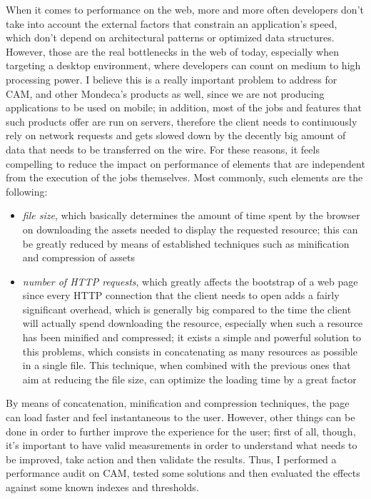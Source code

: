 \documentclass[12pt,oneside,svgnames]{memoir}
\begin{document}
When it comes to performance on the web, more and more often developers
don't take into account the external factors that constrain an
application's speed, which don't depend on architectural patterns or
optimized data structures. However, those are the real bottlenecks in
the web of today, especially when targeting a desktop environment, where
developers can count on medium to high processing power. I believe this
is a really important problem to address for CAM, and other Mondeca's
products as well, since we are not producing applications to be used on
mobile; in addition, most of the jobs and features that such products
offer are run on servers, therefore the client needs to continuously
rely on network requests and gets slowed down by the decently big amount
of data that needs to be transferred on the wire. For these reasons, it
feels compelling to reduce the impact on performance of elements that
are independent from the execution of the jobs themselves. Most
commonly, such elements are the following:

\begin{itemize}
\itemsep1pt\parskip0pt
\item
  \emph{file size}, which basically determines the amount of time spent
  by the browser on downloading the assets needed to display the
  requested resource; this can be greatly reduced by means of
  established techniques such as minification and compression of assets
\item
  \emph{number of HTTP requests}, which greatly affects the bootstrap of
  a web page since every HTTP connection that the client needs to open
  adds a fairly significant overhead, which is generally big compared to
  the time the client will actually spend downloading the resource,
  especially when such a resource has been minified and compressed; it
  exists a simple and powerful solution to this problems, which consists
  in concatenating as many resources as possible in a single file. This
  technique, when combined with the previous ones that aim at reducing
  the file size, can optimize the loading time by a great factor
\end{itemize}

By means of concatenation, minification and compression techniques, the
page can load faster and feel instantaneous to the user. However, other
things can be done in order to further improve the experience for the
user; first of all, though, it's important to have valid measurements in
order to understand what needs to be improved, take action and then
validate the results. Thus, I performed a performance audit on CAM,
tested some solutions and then evaluated the effects against some known
indexes and thresholds.
\end{document}
